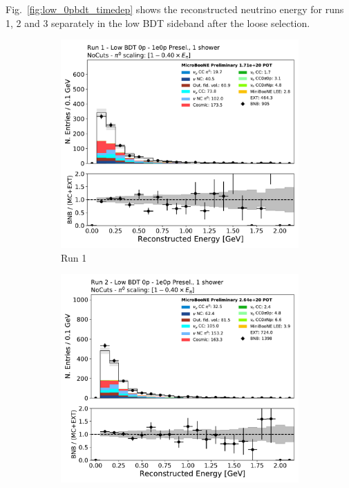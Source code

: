 Fig.~\ref{fig:low_0pbdt_timedep} shows the reconstructed neutrino energy for runs 1, 2 and 3 separately in the low BDT sideband after the loose selection. 
\begin{figure}[H]
    \centering
    \begin{subfigure}{0.3\textwidth}
    \includegraphics[width=1.0\textwidth]{1e0p/Low_BDT_Sideband/run1/reco_e.pdf}
    \caption{Run 1}
    \end{subfigure}
    \begin{subfigure}{0.3\textwidth}
    \includegraphics[width=1.0\textwidth]{1e0p/Low_BDT_Sideband/run2/reco_e.pdf}

\end{subfigure}
\end{figure}
